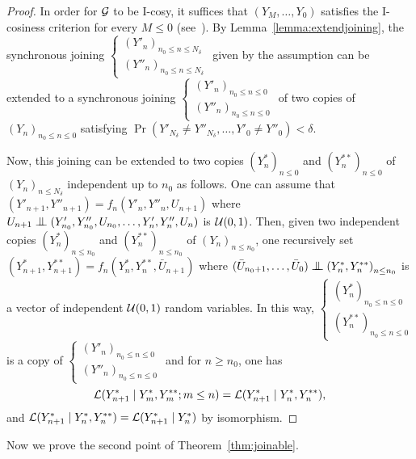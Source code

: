 \documentclass[12pt,a4paper]{article}
\begin{document}
\begin{proof}
In order for $\mathcal{G}$ to be I-cosy, it suffices that 
$(Y_M, \ldots, Y_0)$ satisfies the I-cosiness criterion 
for every $M \leq 0$  (see~\cite{LauXLIII}). 
By Lemma~\ref{lemma:extendjoining}, 
the synchronous joining $\left\{\begin{smallmatrix} {(Y'_n)}_{n_0 \leq n \leq N_\delta} \\ 
{(Y''_n)}_{n_0 \leq n \leq N_\delta}
\end{smallmatrix}\right.$ given by the assumption can be extended 
to a synchronous joining 
$\left\{\begin{smallmatrix} {(Y'_n)}_{n_0 \leq n \leq 0} \\ 
{(Y''_n)}_{n_0 \leq n \leq 0}
\end{smallmatrix}\right.$ of two copies of ${(Y_n)}_{n_0 \leq n \leq 0}$ 
satisfying 
$\Pr(Y'_{N_\delta} \neq Y''_{N_\delta}, \ldots, Y'_0 \neq Y''_0) < \delta$. 

Now, this joining can be extended 
to two copies ${(Y^*_n)}_{n \leq 0}$ and ${(Y^{**}_n)}_{n \leq 0}$ 
of ${(Y_n)}_{n \leq N_\delta}$ independent up to $n_0$ as follows. 
One can assume that $(Y'_{n+1}, Y''_{n+1}) = f_n(Y'_n, Y''_n, U_{n+1})$ 
where $U_{n+1} \indep (Y'_{n_0}, Y''_{n_0}, U_{n_0}, \ldots, Y'_n, Y''_n, U_n)$ 
is $\mathcal{U}(0,1)$. 
Then, given two independent copies 
${(Y^*_n)}_{n \leq n_0}$ and ${(Y^{**}_n)}_{n \leq n_0}$ 
of ${(Y_n)}_{n \leq n_0}$, one  recursively set  
$(Y^*_{n+1}, Y^{**}_{n+1}) = f_n(Y^*_n, Y^{**}_n, \bar U_{n+1})$ where 
$(\bar U_{n_0+1}, \ldots, \bar U_{0}) \indep {(Y^*_n, Y^{**}_n)}_{n \leq n_0}$ 
is a vector of independent $\mathcal{U}(0,1)$ random variables.   
In this way, 
$\left\{\begin{smallmatrix} {(Y^*_n)}_{n_0 \leq n \leq 0} \\ 
{(Y^{**}_n)}_{n_0 \leq n \leq 0}
\end{smallmatrix}\right.$ is a copy of 
$\left\{\begin{smallmatrix} {(Y'_n)}_{n_0 \leq n \leq 0} \\ 
{(Y''_n)}_{n_0 \leq n \leq 0}
\end{smallmatrix}\right.$ and 
for $n \geq n_0$, one has 
$$
\mathcal{L}(Y^*_{n+1} \mid Y^*_m, Y^{**}_m ; m \leq n) = 
\mathcal{L}(Y^*_{n+1} \mid Y^*_n, Y^{**}_n),
$$
and $\mathcal{L}(Y^*_{n+1} \mid Y^*_n, Y^{**}_n)=\mathcal{L}(Y^*_{n+1} \mid Y^*_n)$ 
by isomorphism. 
\end{proof}


Now we  prove the second point of Theorem~\ref{thm:joinable}.
\end{document}
